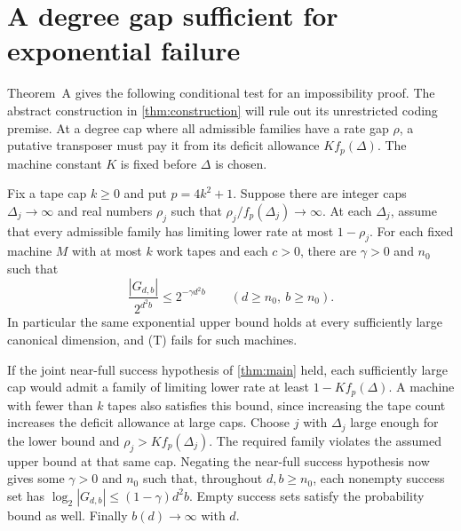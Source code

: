 \section{A degree gap sufficient for exponential failure}\label{sec:consequences}

Theorem~A gives the following conditional test for an impossibility proof.
The abstract construction in \cref{thm:construction} will rule out its
unrestricted coding premise. At a degree cap where
all admissible families have a rate gap $\rho$, a putative transposer
must pay it from its deficit allowance $K f_p(\Delta)$. The machine
constant $K$ is fixed before $\Delta$ is chosen.

\begin{corollary}\label{cor:gap}
Fix a tape cap $k\ge0$ and put $p=4k^2+1$. Suppose there are integer
caps $\Delta_j\to\infty$ and real numbers $\rho_j$ such that
$\rho_j/f_p(\Delta_j)\to\infty$. At each $\Delta_j$, assume that
every admissible family has limiting lower rate at most $1-\rho_j$.
For each fixed machine $M$ with at most $k$ work tapes and each $c>0$,
there are $\gamma>0$ and $n_0$ such that
\[
   \frac{|G_{d,b}|}{2^{d^2b}}
      \le 2^{-\gamma d^2b}
      \qquad(d\ge n_0,\ b\ge n_0).
\]
In particular the same exponential upper bound holds at every
sufficiently large canonical dimension, and (T) fails for such machines.
\end{corollary}

\begin{outline}
If the joint near-full success hypothesis of \cref{thm:main} held,
each sufficiently large cap would admit a family of limiting lower rate
at least $1-K f_p(\Delta)$. A machine with fewer than $k$ tapes also
satisfies this bound, since increasing the tape count increases the
deficit allowance at large caps. Choose $j$ with $\Delta_j$ large
enough for the lower bound and $\rho_j>K f_p(\Delta_j)$. The required
family violates the assumed upper bound at that same cap.
Negating the near-full success hypothesis now gives some $\gamma>0$ and
$n_0$ such that, throughout $d,b\ge n_0$, each nonempty success set has
$\log_2|G_{d,b}|\le(1-\gamma)d^2b$. Empty success sets satisfy the
probability bound as well. Finally $b(d)\to\infty$ with $d$.
\end{outline}

